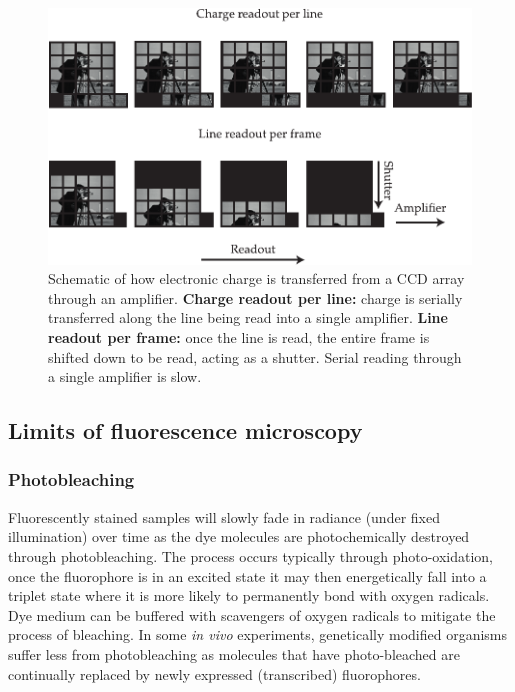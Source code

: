 \begin{figure}
    \centering
    \includegraphics{./sensor_chips}
    \caption{Schematic of how electronic charge is transferred from a \gls{CCD} array through an amplifier.
    \textbf{Charge readout per line:} charge is serially transferred along the line being read into a single amplifier.
    \textbf{Line readout per frame:} once the line is read, the entire frame is shifted down to be read, acting as a shutter.
    Serial reading through a single amplifier is slow.}
    \label{fig:sensor_chips}
\end{figure}



\subsection{Limits of fluorescence microscopy}

\subsubsection{Photobleaching}

Fluorescently stained samples will slowly fade in radiance (under fixed illumination) over time as the dye molecules are photochemically destroyed through photobleaching.
The process occurs typically through photo-oxidation, once the \gls{fluorophore} is in an excited state it may then energetically fall into a triplet state where it is more likely to permanently bond with oxygen radicals.
Dye medium can be buffered with scavengers of oxygen radicals to mitigate the process of bleaching.
In some \emph{in vivo} experiments, genetically modified organisms suffer less from photobleaching as molecules that have photo-bleached are continually replaced by newly expressed (transcribed) \gls{fluorophore}s.

